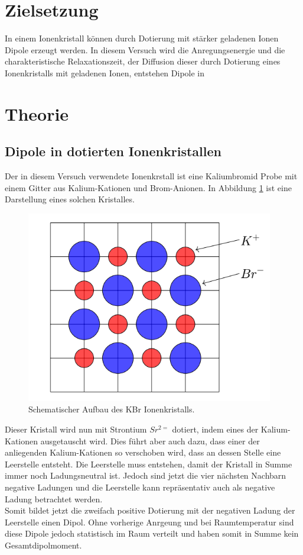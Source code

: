 \section{Zielsetzung}
In einem Ionenkristall können durch Dotierung mit stärker geladenen Ionen Dipole erzeugt werden. 
In diesem Versuch wird die Anregungsenergie und die charakteristische Relaxationszeit, der Diffusion dieser 
durch Dotierung eines Ionenkristalls mit geladenen Ionen, entstehen Dipole in 

\section{Theorie}
	\subsection{Dipole in dotierten Ionenkristallen}
		Der in diesem Versuch verwendete Ionenkrstall ist eine Kaliumbromid Probe mit einem Gitter aus Kalium-Kationen und Brom-Anionen.
		In Abbildung \ref{fig:KBr} ist eine Darstellung eines solchen Kristalles.
		\begin{figure}
			\centering
			\includegraphics[]{latex/images/Kristall.PNG}
			\caption{Schematischer Aufbau des KBr Ionenkristalls.}
			\label{fig:KBr}
		\end{figure}
		Dieser Kristall wird nun mit Strontium $Sr^{2=}$ dotiert, indem eines der Kalium-Kationen ausgetauscht wird.
		Dies führt aber auch dazu, dass einer der anliegenden Kalium-Kationen so verschoben wird, dass an dessen Stelle eine Leerstelle entsteht.
		Die Leerstelle muss entstehen, damit der Kristall in Summe immer noch Ladungsneutral ist.
		Jedoch sind jetzt die vier nächsten Nachbarn negative Ladungen und die Leerstelle kann repräsentativ auch als negative Ladung betrachtet werden.\\
		Somit bildet jetzt die zweifach positive Dotierung mit der negativen Ladung der Leerstelle einen Dipol. 
		Ohne vorherige Anrgeung und bei Raumtemperatur sind diese Dipole jedoch statistisch im Raum verteilt und haben somit in Summe kein Gesamtdipolmoment. 

